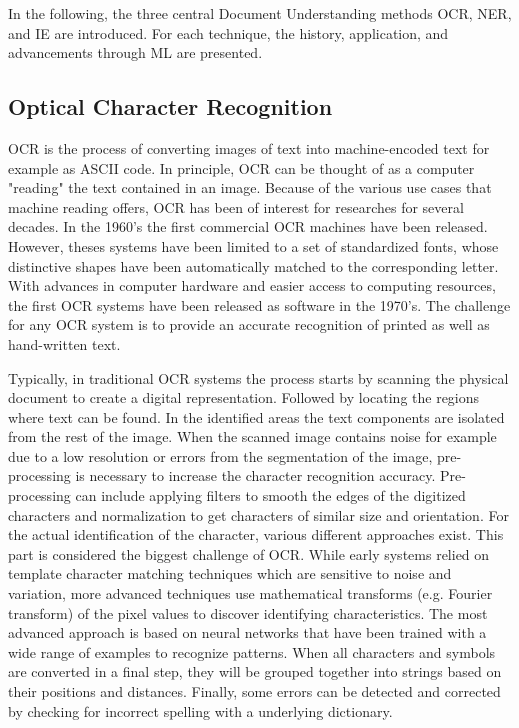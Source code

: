 In the following, the three central Document Understanding methods \ac{OCR}, \ac{NER}, and \ac{IE} are introduced. For each technique, the history, application, and advancements through \ac{ML} are presented.
\subsection{Optical Character Recognition}
\acf{OCR} is the process of converting images of text into machine-encoded text for example as ASCII code. In principle, \ac{OCR} can be thought of as a computer "reading" the text contained in an image. 
Because of the various use cases that machine reading offers, \ac{OCR} has been of interest for researches for several decades. In the 1960's the first commercial \ac{OCR} machines have been released. However, theses systems have been limited to a set of standardized fonts, whose distinctive shapes have been automatically matched to the corresponding letter. 
With advances in computer hardware and easier access to computing resources, the first \ac{OCR} systems have been released as software in the 1970's. 
The challenge for any \ac{OCR} system is to provide an accurate recognition of printed as well as hand-written text. \cite{eikvil1993optical}

Typically, in traditional \ac{OCR} systems the process starts by scanning the physical document to create a digital representation. Followed by locating the regions where text can be found. In the identified areas the text components are isolated from the rest of the image. When the scanned image contains noise for example due to a low resolution or errors from the segmentation of the image, pre-processing is necessary to increase the character recognition accuracy. Pre-processing can include applying filters to smooth the edges of the digitized characters and normalization to get characters of similar size and orientation. For the actual identification of the character, various different approaches exist. This part is considered the biggest challenge of \ac{OCR}. While early systems relied on template character matching techniques which are sensitive to noise and variation, more advanced techniques use mathematical transforms (e.g. Fourier transform) of the pixel values to discover identifying characteristics. The most advanced approach is based on neural networks that have been trained with a wide range of examples to recognize patterns. When all characters and symbols are converted in a final step, they will be grouped together into strings based on their positions and distances. Finally, some errors can be detected and corrected by checking for incorrect spelling with a underlying dictionary.
\cite{eikvil1993optical,nagy1999optical}

